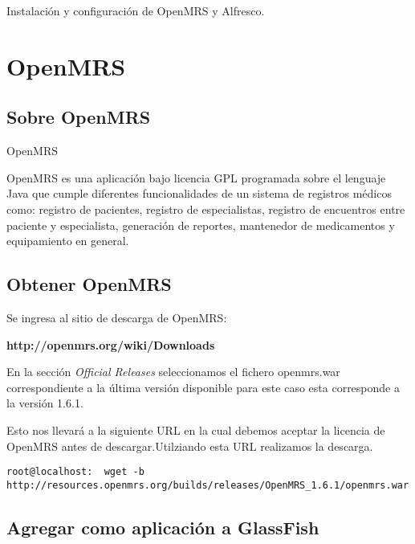 Instalación y configuración de OpenMRS y Alfresco.


\section{OpenMRS}

\subsection{Sobre OpenMRS}


\begin{description}
\item OpenMRS

OpenMRS es una aplicación  bajo licencia GPL programada sobre el lenguaje Java que cumple diferentes funcionalidades de un sistema de registros médicos como: registro de pacientes, registro de especialistas, registro de encuentros entre paciente y especialista, generación de reportes, mantenedor de medicamentos y equipamiento en general.
\end{description}


\subsection{Obtener OpenMRS}

Se ingresa al sitio de descarga de OpenMRS:
\begin{center}\textbf{http://openmrs.org/wiki/Downloads}\end{center}

En la sección \textit{Official Releases} seleccionamos el fichero openmrs.war correspondiente a la última versión disponible para este caso esta corresponde a la versión 1.6.1.
\newline

Esto nos llevará a la siguiente URL en la cual debemos aceptar la licencia de OpenMRS antes de descargar.Utilziando esta URL realizamos la descarga.
\newline

\lstset{language=sh}
\begin{lstlisting}
root@localhost:  wget -b http://resources.openmrs.org/builds/releases/OpenMRS_1.6.1/openmrs.war
\end{lstlisting}

\subsection{Agregar como aplicación a GlassFish}

